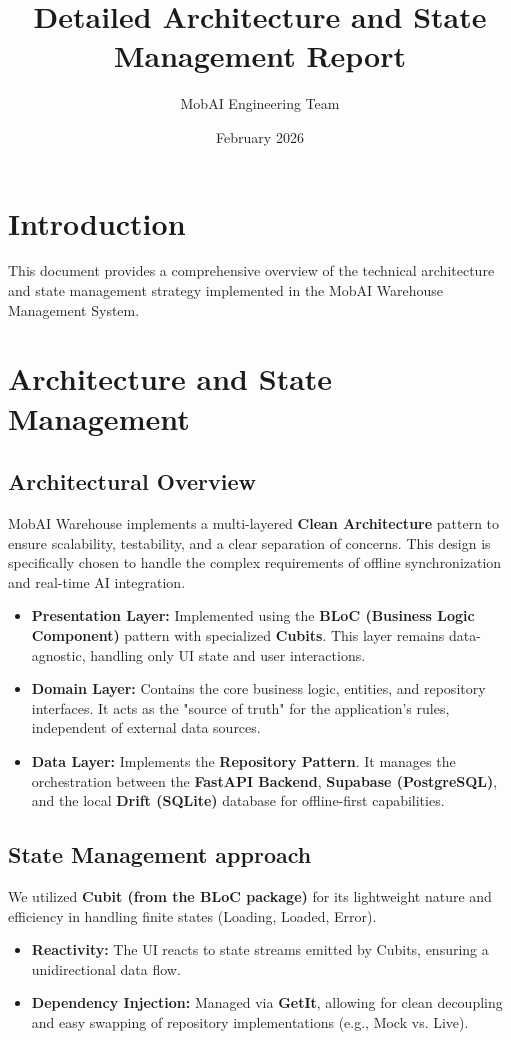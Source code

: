 \documentclass{article}
\title{Detailed Architecture and State Management Report}
\author{MobAI Engineering Team}
\date{February 2026}
\begin{document}
\maketitle

\section{Introduction}
This document provides a comprehensive overview of the technical architecture and state management strategy implemented in the MobAI Warehouse Management System.

\section{Architecture and State Management}

\subsection{Architectural Overview}
MobAI Warehouse implements a multi-layered \textbf{Clean Architecture} pattern to ensure scalability, testability, and a clear separation of concerns. This design is specifically chosen to handle the complex requirements of offline synchronization and real-time AI integration.

\begin{itemize}
    \item \textbf{Presentation Layer:} Implemented using the \textbf{BLoC (Business Logic Component)} pattern with specialized \textbf{Cubits}. This layer remains data-agnostic, handling only UI state and user interactions.
    \item \textbf{Domain Layer:} Contains the core business logic, entities, and repository interfaces. It acts as the "source of truth" for the application's rules, independent of external data sources.
    \item \textbf{Data Layer:} Implements the \textbf{Repository Pattern}. It manages the orchestration between the \textbf{FastAPI Backend}, \textbf{Supabase (PostgreSQL)}, and the local \textbf{Drift (SQLite)} database for offline-first capabilities.
\end{itemize}

\subsection{State Management approach}
We utilized \textbf{Cubit (from the BLoC package)} for its lightweight nature and efficiency in handling finite states (Loading, Loaded, Error).
\begin{itemize}
    \item \textbf{Reactivity:} The UI reacts to state streams emitted by Cubits, ensuring a unidirectional data flow.
    \item \textbf{Dependency Injection:} Managed via \textbf{GetIt}, allowing for clean decoupling and easy swapping of repository implementations (e.g., Mock vs. Live).
\end{itemize}
\end{document}
